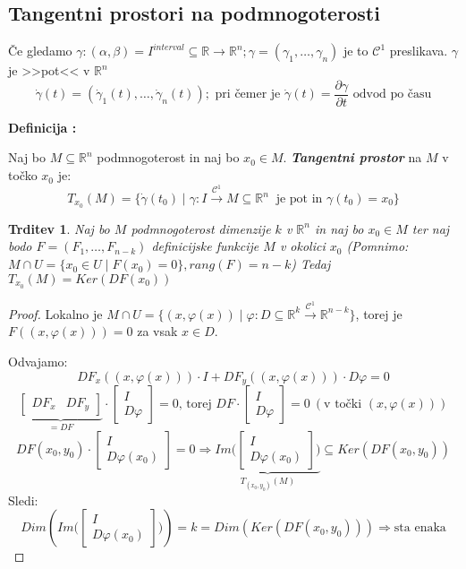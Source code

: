 \documentclass[a4paper, 10pt]{article}
\newtheorem{trditev}{Trditev}
\newcounter{defcount}
\newenvironment{definicija}{\begin{flushleft}\stepcounter{defcount}\textbf{Definicija \arabic{defcount}:}}{\hfill\end{flushleft}}
\newcommand{\mth}[1]{\ensuremath{\mathbb{#1}}}
\newcommand{\R}{\mth{R}}
\newcommand{\pojem}[1]{\textbf{\textit{#1}}}
\newcommand{\con}{\ensuremath{\mathscr{C}}}
\begin{document}
\subsection{Tangentni prostori na podmnogoterosti}

Če gledamo $\gamma: (\alpha, \beta) = I^{interval} \subseteq \R \rightarrow \R^n; \gamma = (\gamma_1, \ldots, \gamma_n)$ je to $\con^1$ preslikava. $\gamma$ je >>pot<< v $\R^n$
\[
\dot{\gamma}(t) = (\dot{\gamma}_1(t), \ldots, \dot{\gamma}_n(t));\text{~pri čemer je~} \dot{\gamma}(t) = \frac{\partial\gamma}{\partial t} \text{~odvod po času}
\]

\begin{definicija}

Naj bo $M \subseteq \R^n$ podmnogoterost in naj bo $x_0 \in M$. \pojem{Tangentni prostor} na $M$ v točko $x_0$ je:
\[
T_{x_0}(M) = \{\dot{\gamma}(t_0)\mid \gamma : I \xrightarrow{\con^1} M \subseteq \R^n\ \text{~je pot in~} \gamma(t_0) = x_0\}
\]
\end{definicija}

\begin{trditev}

Naj bo $M$ podmnogoterost dimenzije $k$ v $\R^n$ in naj bo $x_0 \in M$ ter naj bodo $F = (F_1, \ldots, F_{n - k})$ definicijske funkcije $M$ v okolici $x_0$ (Pomnimo: $M \cap U = \{x_0 \in U \mid F(x_0) = 0\}, rang(F) = n - k $)
Tedaj $T_{x_0}(M) = Ker(DF(x_0))$

\end{trditev}

\begin{proof}

Lokalno je $M \cap U = \{ (x, \varphi(x))\mid \varphi: D\subseteq \R^k \xrightarrow{\con^1} \R^{n - k}\}$, torej je $F((x, \varphi(x))) = 0$ za vsak $x\in D$.

Odvajamo:
\[
DF_x((x, \varphi(x))) \cdot I + DF_y((x, \varphi(x))) \cdot D\varphi = 0
\]
\[
\underbrace{\begin{bmatrix}
DF_x & DF_y
\end{bmatrix}}_{=DF}
\cdot
\begin{bmatrix}
I \\
D\varphi
\end{bmatrix} 
= 0 \text{,~torej~} DF \cdot
\begin{bmatrix}
I \\
D\varphi
\end{bmatrix} = 0 ~(\text{v točki~} (x, \varphi(x)))
\]
\[
DF(x_0, y_0) \cdot
\begin{bmatrix}
I \\
D\varphi(x_0)
\end{bmatrix} = 0 
\Rightarrow
\underbrace{Im\bigg(\begin{bmatrix}
I \\
D\varphi(x_0)
\end{bmatrix}\bigg)}_{T_{(x_0, y_0)}(M)} \subseteq Ker(DF(x_0, y_0))
\]
Sledi:
\[
Dim(Im\bigg(\begin{bmatrix}
I \\
D\varphi(x_0)
\end{bmatrix}\bigg)) = k = Dim(Ker(DF(x_0, y_0))) \Rightarrow \text{sta enaka}
\]
\end{proof}
\end{document}
